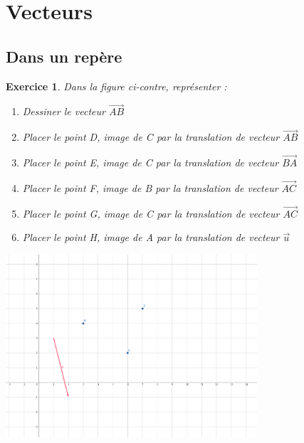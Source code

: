 \documentclass[10pt,a4paper]{article}
\newtheorem{exo}{Exercice}
\begin{document}
\setcounter{section}{2}
\setcounter{exo}{0}
\section{Vecteurs}

\subsection{Dans un repère}


\begin{exo}
    Dans la figure ci-contre, représenter : \begin{enumerate}
        \item Dessiner le vecteur $\overrightarrow{AB}$
        \item Placer le point D, image de C par la translation de vecteur $\overrightarrow{AB}$
        \item Placer le point E, image de C par la translation de vecteur $\overrightarrow{BA}$
        \item Placer le point F, image de B par la translation de vecteur $\overrightarrow{AC}$
        \item Placer le point G, image de C par la translation de vecteur $\overrightarrow{AC}$
        \item Placer le point H, image de A par la translation de vecteur $\overrightarrow{u}$
        
    \end{enumerate}
    \center
    \includegraphics[width=0.7\textwidth]{assets/Exo1-vecteurs.png} 

\end{exo}
\end{document}
